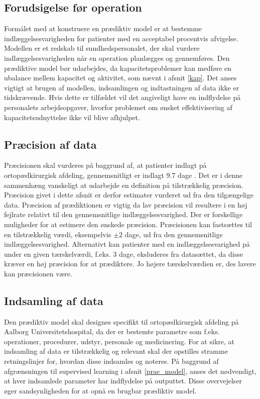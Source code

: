 \subsection{Forudsigelse før operation} 
Formålet med at konstruere en prædiktiv model er at bestemme indlæggelsesvarigheden for patienter med en acceptabel procentvis afvigelse. Modellen er et redskab til sundhedspersonalet, der skal vurdere indlæggelsesvarigheden når en operation planlægges og gennemføres. Den prædiktive model bør udarbejdes, da kapacitetsproblemer kan medføre en ubalance mellem kapacitet og aktivitet, som nævnt i afsnit \ref{kap}. Det anses vigtigt at brugen af modellen, indsamlingen og indtastningen af data ikke er tidskrævende. Hvis dette er tilfældet vil det angiveligt have en indflydelse på personalets arbejdsopgaver, hvorfor problemet om ønsket effektivisering af kapacitetsudnyttelse ikke vil blive afhjulpet.

\subsection{Præcision af data}
Præcisionen skal vurderes på baggrund af, at patienter indlagt på ortopædkirurgisk afdeling, gennemsnitligt er indlagt 9.7 dage .
Det er i denne sammenhæng vanskeligt at udarbejde en definition på tilstrækkelig præcision. Præcision givet i dette afsnit er derfor estimater vurderet ud fra den tilgængelige data.
Præcision af prædiktionen er vigtig da lav præcision vil resultere i en høj fejlrate relativt til den gennemsnitlige indlæggelsesvarighed.
Der er forskellige muligheder for at estimere den ønskede præcision. 
Præcisionen kan fastsættes til en tilstrækkelig værdi, eksempelvis $\pm 2$ dage, ud fra den gennemsnitlige indlæggelsesvarighed. 
Alternativt kan patienter med en indlæggelsesvarighed på under en given tærskelværdi, f.eks. $3$ dage, eksluderes fra datasættet, da disse kræver en høj præcision for at prædiktere. Jo højere tærskelværdien er, des lavere kan præcisionen være.



\subsection{Indsamling af data}
Den prædiktiv model skal designes specifikt til ortopædkirurgisk afdeling på Aalborg Universitetshospital, da der er bestemte parametre som f.eks. operationer, procedurer, udstyr, personale og medicinering. For at sikre, at indsamling af data er tilstrækkelig og relevant skal der opstilles stramme retningslinjer for, hvordan disse indsamles og noteres. På baggrund af afgrænsningen til supervised learning i afsnit \ref{prae_model}, anses det nødvendigt, at hver indsamlede parameter har indflydelse på outputtet. Disse overvejelser øger sandsynligheden for at opnå en brugbar prædiktiv model. 


